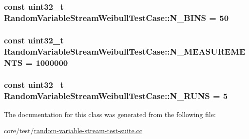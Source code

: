 \subsubsection[{\texorpdfstring{N\+\_\+\+B\+I\+NS}{N_BINS}}]{\setlength{\rightskip}{0pt plus 5cm}const uint32\+\_\+t Random\+Variable\+Stream\+Weibull\+Test\+Case\+::\+N\+\_\+\+B\+I\+NS = 50\hspace{0.3cm}{\ttfamily [static]}}\hypertarget{classRandomVariableStreamWeibullTestCase_ab240f1ad374ca6d998a4a720c619cc2d}{}\label{classRandomVariableStreamWeibullTestCase_ab240f1ad374ca6d998a4a720c619cc2d}
\subsubsection[{\texorpdfstring{N\+\_\+\+M\+E\+A\+S\+U\+R\+E\+M\+E\+N\+TS}{N_MEASUREMENTS}}]{\setlength{\rightskip}{0pt plus 5cm}const uint32\+\_\+t Random\+Variable\+Stream\+Weibull\+Test\+Case\+::\+N\+\_\+\+M\+E\+A\+S\+U\+R\+E\+M\+E\+N\+TS = 1000000\hspace{0.3cm}{\ttfamily [static]}}\hypertarget{classRandomVariableStreamWeibullTestCase_a1f058dd1e083f78a0912c228cd1753bc}{}\label{classRandomVariableStreamWeibullTestCase_a1f058dd1e083f78a0912c228cd1753bc}
\subsubsection[{\texorpdfstring{N\+\_\+\+R\+U\+NS}{N_RUNS}}]{\setlength{\rightskip}{0pt plus 5cm}const uint32\+\_\+t Random\+Variable\+Stream\+Weibull\+Test\+Case\+::\+N\+\_\+\+R\+U\+NS = 5\hspace{0.3cm}{\ttfamily [static]}}\hypertarget{classRandomVariableStreamWeibullTestCase_a898888ac45565faf424bc30c07cb5131}{}\label{classRandomVariableStreamWeibullTestCase_a898888ac45565faf424bc30c07cb5131}


The documentation for this class was generated from the following file\+:\begin{DoxyCompactItemize}
\item 
core/test/\hyperlink{random-variable-stream-test-suite_8cc}{random-\/variable-\/stream-\/test-\/suite.\+cc}\end{DoxyCompactItemize}
